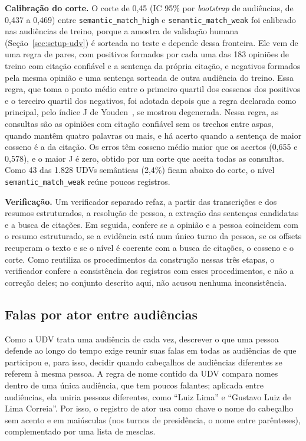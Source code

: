 \textbf{Calibração do corte.} O corte de 0,45 (IC 95\% por \textit{bootstrap} de audiências, de 0,437
a 0,469) entre \texttt{semantic\_match\_high} e \texttt{semantic\_match\_weak} foi calibrado nas
audiências de treino, porque a amostra de validação humana (Seção~\ref{sec:setup-udv}) é sorteada
no teste e depende dessa fronteira. Ele vem de uma regra de pares, com positivos formados por cada
uma das 183 opiniões de treino com citação confiável e a sentença da própria citação, e negativos
formados pela mesma opinião e uma sentença sorteada de outra audiência do treino. Essa regra, que toma
o ponto médio entre o primeiro quartil dos cossenos dos positivos e o terceiro quartil dos negativos,
foi adotada depois que a regra declarada como principal, pelo índice J de
Youden~\citep{youden1950index}, se mostrou degenerada. Nessa regra, as consultas são as opiniões com
citação confiável sem os trechos entre aspas, quando mantêm quatro palavras ou mais, e há acerto quando a sentença de maior cosseno é a da
citação. Os erros têm cosseno médio maior que os acertos (0,655 e 0,578), e o maior J é zero, obtido
por um corte que aceita todas as consultas. Como 43 das
1.828 UDVs semânticas (2,4\%) ficam abaixo do corte, o nível \texttt{semantic\_match\_weak} reúne
poucos registros.

\textbf{Verificação.} Um verificador separado refaz, a partir das transcrições e dos resumos
estruturados, a resolução de pessoa, a extração das sentenças candidatas e a busca de citações.
Em seguida, confere se a opinião e a pessoa coincidem com o resumo estruturado, se a evidência está
num único turno da pessoa, se os offsets recuperam o texto e se o nível é coerente com a busca de
citações, o cosseno e o corte. Como reutiliza os procedimentos da construção nessas três etapas, o
verificador confere a consistência dos registros com esses procedimentos, e não a correção deles; no
conjunto descrito aqui, não acusou nenhuma inconsistência.

\subsection{Falas por ator entre audiências}
\label{sec:metodo-atores}

Como a UDV trata uma audiência de cada vez, descrever o que uma pessoa defende ao longo do tempo
exige reunir suas falas em todas as audiências de que participou e, para isso, decidir quando
cabeçalhos de audiências diferentes se referem à mesma pessoa. A regra de nome contido da UDV compara
nomes dentro de uma única audiência, que tem poucos falantes; aplicada entre audiências, ela uniria
pessoas diferentes, como ``Luiz Lima'' e ``Gustavo Luiz de Lima Correia''. Por isso, o registro de
ator usa como chave o nome do cabeçalho sem acento e em maiúsculas (nos turnos de presidência, o nome
entre parênteses), complementado por uma lista de mesclas.

